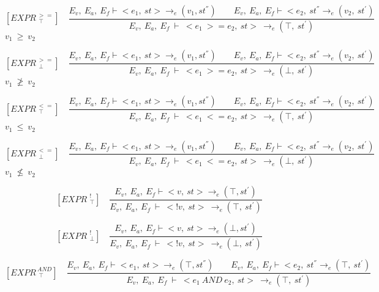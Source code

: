    	\[
   	[EXPR^{\ >=}_{\ \ \top}] \quad
   	\dfrac{E_v, \ E_a, \ E_f \vdash <e_1, \ st> \rightarrow_e (v_1, st^{''}) \qquad E_v, \ E_a, \ E_f \vdash <e_2, \ st^{''} \rightarrow_e (v_2, \ st^{'})}{E_v, \ E_a, \ E_f \ \vdash \ <e_1 \ >= e_2, \ st> \ \rightarrow_e (\top, \ st^{'})}
   	\]
	\begin{math}
   	v_1 \ \ge \ v_2
   	\end{math}   	
   	

   	\[
   	[EXPR^{\ >=}_{\ \ \bot}] \quad
   	\dfrac{E_v, \ E_a, \ E_f \vdash <e_1, \ st> \rightarrow_e (v_1, st^{''}) \qquad E_v, \ E_a, \ E_f \vdash <e_2, \ st^{''} \rightarrow_e (v_2, \ st^{'})}{E_v, \ E_a, \ E_f \ \vdash \ <e_1 \ >= e_2, \ st> \ \rightarrow_e (\bot, \ st^{'})}
   	\]
	\begin{math}
   	v_1 \ \ngeq \ v_2
   	\end{math}
   	
   	\[
   	[EXPR^{\ <=}_{\ \ \top}] \quad
   	\dfrac{E_v, \ E_a, \ E_f \vdash <e_1, \ st> \rightarrow_e (v_1, st^{''}) \qquad E_v, \ E_a, \ E_f \vdash <e_2, \ st^{''} \rightarrow_e (v_2, \ st^{'})}{E_v, \ E_a, \ E_f \ \vdash \ <e_1 \ <= e_2, \ st> \ \rightarrow_e (\top, \ st^{'})}
   	\]
	\begin{math}
   	v_1 \ \le \ v_2
   	\end{math}   	
   	

   	\[
   	[EXPR^{\ <=}_{\ \ \bot}] \quad
   	\dfrac{E_v, \ E_a, \ E_f \vdash <e_1, \ st> \rightarrow_e (v_1, st^{''}) \qquad E_v, \ E_a, \ E_f \vdash <e_2, \ st^{''} \rightarrow_e (v_2, \ st^{'})}{E_v, \ E_a, \ E_f \ \vdash \ <e_1 \ <= e_2, \ st> \ \rightarrow_e (\bot, \ st^{'})}
   	\]
	\begin{math}
   	v_1 \ \nleq \ v_2
   	\end{math}
   	
   	\[
   	[EXPR^{\ \ !}_{\ \ \top}] \quad
   	\dfrac{E_v, \ E_a, \ E_f \vdash <v, \ st> \rightarrow_e (\top, st^{'})}{E_v, \ E_a, \ E_f \ \vdash \ <!v, \ st> \ \rightarrow_e (\top, \ st^{'})}
   	\]  	  	

   	\[
   	[EXPR^{\ \ !}_{\ \ \bot}] \quad
   	\dfrac{E_v, \ E_a, \ E_f \vdash <v, \ st> \rightarrow_e (\bot, st^{'})}{E_v, \ E_a, \ E_f \ \vdash \ <!v, \ st> \ \rightarrow_e (\bot, \ st^{'})}
   	\]
   	
   	
   	\[
   	[EXPR^{\ AND}_{\ \ \top}] \quad
   	\dfrac{E_v, \ E_a, \ E_f \vdash <e_1, \ st> \rightarrow_e (\top, st^{''}) \qquad E_v, \ E_a, \ E_f \vdash <e_2, \ st^{''} \rightarrow_e (\top, \ st^{'})}{E_v, \ E_a, \ E_f \ \vdash \ <e_1 \ AND \ e_2, \ st> \ \rightarrow_e (\top, \ st^{'})}
   	\]  	
   	
